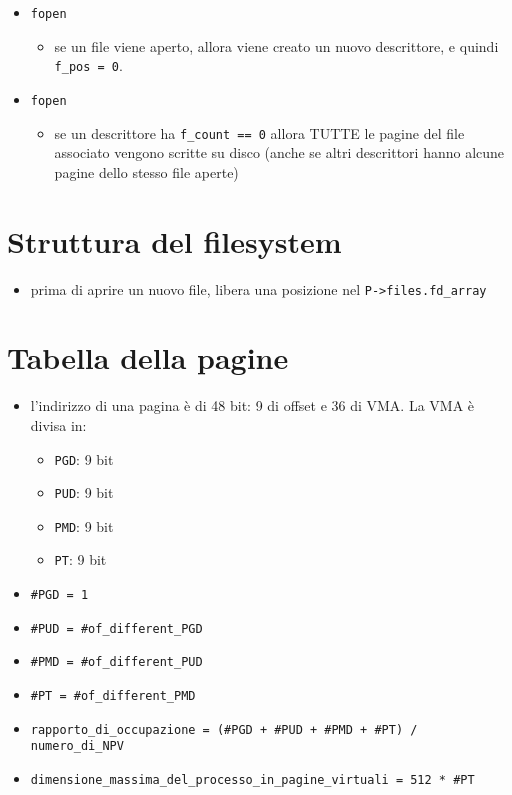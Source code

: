 \documentclass[12pt, a4paper]{report}
\begin{document}
\begin{itemize}
	\item \texttt{fopen}
	      \begin{itemize}
		      \item se un file viene aperto, allora viene creato un nuovo
		            descrittore, e quindi \texttt{f\_pos = 0}.
	      \end{itemize}
	\item \texttt{fopen}
	      \begin{itemize}
			  \item se un descrittore ha \texttt{f\_count == 0} allora TUTTE le
				  pagine del file associato vengono scritte su disco (anche se
				  altri descrittori hanno alcune pagine dello stesso file
				  aperte)
	      \end{itemize}
\end{itemize}

\newpage
\section*{Struttura del filesystem}
\begin{itemize}
	\item prima di aprire un nuovo file, libera una posizione nel
	      \texttt{P->files.fd\_array}
\end{itemize}

\newpage
\section*{Tabella della pagine}
\begin{itemize}
	\item l'indirizzo di una pagina è di 48 bit: 9 di offset e 36 di VMA. La
	      VMA è divisa in:
	      \begin{itemize}
		      \item \texttt{PGD}: 9 bit
		      \item \texttt{PUD}: 9 bit
		      \item \texttt{PMD}: 9 bit
		      \item \texttt{PT}: 9 bit
	      \end{itemize}
	\item \texttt{\#PGD = 1}
	\item \texttt{\#PUD = \#of\_different\_PGD}
	\item \texttt{\#PMD = \#of\_different\_PUD}
	\item \texttt{\#PT = \#of\_different\_PMD}
	\item \texttt{rapporto\_di\_occupazione = (\#PGD + \#PUD + \#PMD + \#PT) /
		numero\_di\_NPV} \item
		\texttt{dimensione\_massima\_del\_processo\_in\_pagine\_virtuali =
		      512 * \#PT}
\end{itemize}
\end{document}
